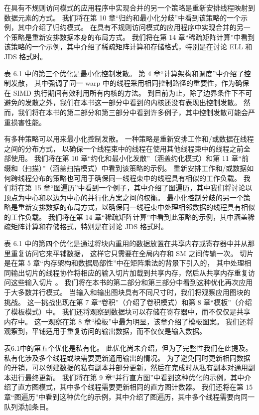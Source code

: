 在具有不规则访问模式的应用程序中实现合并的另一个策略是重新安排线程映射到数据元素的方式。 
我们将在第 10 章“归约和最小化分歧”中看到该策略的一个示例，其中介绍了归约模式。 
在具有不规则访问模式的应用程序中实现合并的另一个策略是重新安排数据本身的布局方式。 
我们将在第 14 章“稀疏矩阵计算”中看到该策略的一个示例，其中介绍了稀疏矩阵计算和存储格式，特别是在讨论 ELL 和 JDS 格式时。

表 6.1 中的第三个优化是最小化控制发散。 第 4 章“计算架构和调度”中介绍了控制发散，
其中强调了同一 warp 中的线程采用相同控制路径的重要性，作为确保在 SIMD 执行期间有效利用所有内核的方法。 
到目前为止，除了边界条件下不可避免的发散之外，我们在本书这一部分中看到的内核还没有表现出控制发散。 
然而，我们将在本书的第二部分和第三部分中看到许多例子，其中控制发散可能会严重损害性能。

有多种策略可以用来最小化控制发散。 一种策略是重新安排工作和/或数据在线程之间的分布方式，
以确保一个线程束中的线程在使用其他线程束中的线程之前全部使用。 
我们将在第 10 章“约化和最小化发散”（涵盖约化模式）和第 11 章“前缀和（扫描）”（涵盖扫描模式）中看到该策略的示例。 
重新安排工作和/或数据如何跨线程分布的策略也可用于确保同一线程束中的线程具有相似的工作负载。 
我们将在第 15 章“图遍历”中看到一个例子，其中介绍了图遍历，其中我们将讨论以顶点为中心和以边为中心的并行化方案之间的权衡。 
最小化控制分歧的另一个策略是重新安排数据的布局方式，以确保同一线程束中处理相邻数据的线程具有相似的工作负载。 
我们将在第 14 章“稀疏矩阵计算”中看到此策略的示例，其中涵盖稀疏矩阵计算和存储格式，特别是在讨论 JDS 格式时。

表 6.1 中的第四个优化是通过将块内重用的数据放置在共享内存或寄存器中并从那里重复访问它来平铺数据，
这样它只需要在全局内存和 SM 之间传输一次。 切片是在第 5 章“内存架构和数据局部性”中在矩阵乘法的背景下引入的，
其中处理相同输出切片的线程协作将相应的输入切片加载到共享内存，然后从共享内存重复访问这些输入切片 。 
我们将在本书的第二部分和第三部分中看到这种优化再次应用于大多数并行模式。 
当输入和输出图块具有不同尺寸时，我们将观察应用图块的挑战。 
这一挑战出现在第 7 章“卷积”（介绍了卷积模式）和第 8 章“模板”（介绍了模板模式）中。 
我们还将观察到数据块可以存储在寄存器中，而不仅仅是共享内存中。 
这一观察在第 8 章“模板”中最为明显，该章介绍了模板图案。 
我们还将观察到，平铺适用于重复访问的输出数据，而不仅仅是输入数据。

表6.1中的第五个优化是私有化。 此优化尚未介绍，但为了完整性我们在此提及。 
私有化涉及多个线程或块需要更新通用输出的情况。 
为了避免同时更新相同数据的开销，可以创建数据的私有副本并部分更新，然后在完成时从私有副本对通用副本进行最终更新。 
我们将在第 9 章“并行直方图”中看到这种优化的示例，其中介绍了直方图模式，其中多个线程需要更新相同的直方图计数器。 
我们还将在第 15 章“图遍历”中看到这种优化的示例，其中介绍了图遍历，其中多个线程需要向同一队列添加条目。

